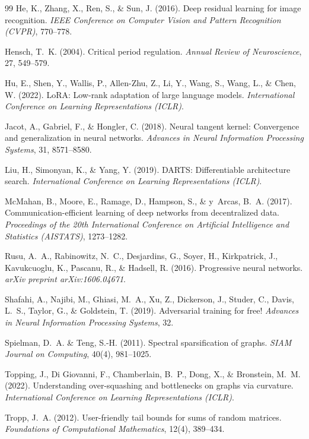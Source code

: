 \documentclass[12pt, a4paper, openany]{report}
\begin{document}
\begin{thebibliography}{99}
He, K., Zhang, X., Ren, S., \& Sun, J. (2016).
Deep residual learning for image recognition.
\textit{IEEE Conference on Computer Vision and Pattern Recognition (CVPR)},
770--778.

Hensch, T.~K. (2004).
Critical period regulation.
\textit{Annual Review of Neuroscience}, 27, 549--579.

Hu, E., Shen, Y., Wallis, P., Allen-Zhu, Z., Li, Y., Wang, S.,
Wang, L., \& Chen, W. (2022).
LoRA: Low-rank adaptation of large language models.
\textit{International Conference on Learning Representations (ICLR)}.

Jacot, A., Gabriel, F., \& Hongler, C. (2018).
Neural tangent kernel: Convergence and generalization in neural networks.
\textit{Advances in Neural Information Processing Systems}, 31, 8571--8580.

Liu, H., Simonyan, K., \& Yang, Y. (2019).
DARTS: Differentiable architecture search.
\textit{International Conference on Learning Representations (ICLR)}.

McMahan, B., Moore, E., Ramage, D., Hampson, S., \& y~Arcas, B.~A. (2017).
Communication-efficient learning of deep networks from decentralized data.
\textit{Proceedings of the 20th International Conference on Artificial
Intelligence and Statistics (AISTATS)}, 1273--1282.

Rusu, A.~A., Rabinowitz, N.~C., Desjardins, G., Soyer, H., Kirkpatrick, J.,
Kavukcuoglu, K., Pascanu, R., \& Hadsell, R. (2016).
Progressive neural networks.
\textit{arXiv preprint arXiv:1606.04671}.

Shafahi, A., Najibi, M., Ghiasi, M.~A., Xu, Z., Dickerson, J., Studer, C.,
Davis, L.~S., Taylor, G., \& Goldstein, T. (2019).
Adversarial training for free!
\textit{Advances in Neural Information Processing Systems}, 32.

Spielman, D.~A. \& Teng, S.-H. (2011).
Spectral sparsification of graphs.
\textit{SIAM Journal on Computing}, 40(4), 981--1025.

Topping, J., Di Giovanni, F., Chamberlain, B.~P., Dong, X., \&
Bronstein, M.~M. (2022).
Understanding over-squashing and bottlenecks on graphs via curvature.
\textit{International Conference on Learning Representations (ICLR)}.

Tropp, J.~A. (2012).
User-friendly tail bounds for sums of random matrices.
\textit{Foundations of Computational Mathematics}, 12(4), 389--434.


\end{thebibliography}
\end{document}
